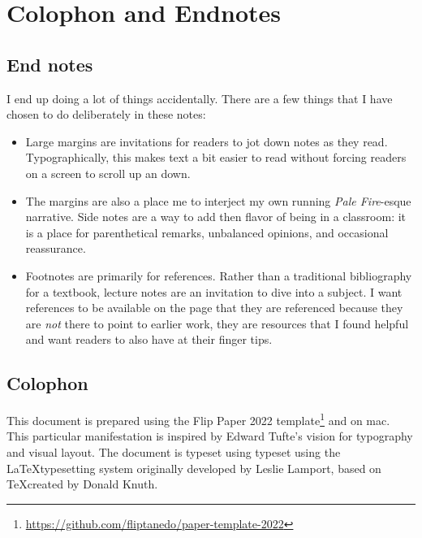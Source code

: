 \chapter{Colophon and Endnotes}


\section{End notes}

I end up doing a lot of things accidentally. There are a few things that I have chosen to do deliberately in these notes:
\begin{itemize}
	\item Large margins are invitations for readers to jot down notes as they read. Typographically, this makes text a bit easier to read without forcing readers on a screen to scroll up an down.
	\item The margins are also a place me to interject my own running \emph{Pale Fire}-esque narrative. Side notes are a way to add then flavor of being in a classroom: it is a place for parenthetical remarks, unbalanced opinions, and occasional reassurance. 
	\item Footnotes are primarily for references. Rather than a traditional bibliography for a textbook, lecture notes are an invitation to dive into a subject. I want references to be available on the page that they are referenced because they are \emph{not} there to point to earlier work, they are resources that I found helpful and want readers to also have at their finger tips.
\end{itemize}

\section{Colophon}

This document is prepared using the Flip Paper 2022 template\footnote{\url{https://github.com/fliptanedo/paper-template-2022}} and  on mac. This particular manifestation is inspired by Edward Tufte's vision for typography and visual layout.\autocite{tufte2001visual} The document is typeset using typeset using the \LaTeX typesetting system originally developed by Leslie Lamport, based on \TeX created by Donald Knuth. 

